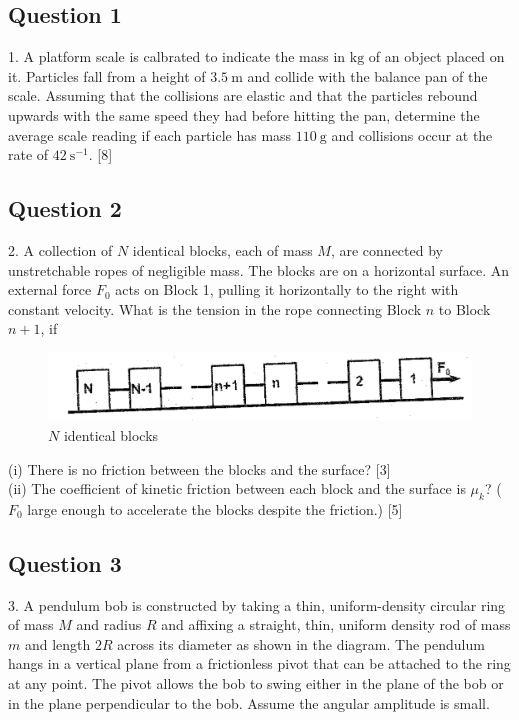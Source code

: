 \documentclass{article}
\begin{document}
\subsection{Question 1}
1. A platform scale is calbrated to indicate the mass in $\mathrm{kg}$ of an object placed on it. Particles fall from a height of $3.5 \mathrm{~m}$ and collide with the balance pan of the scale. Assuming that the collisions are elastic and that the particles rebound upwards with the same speed they had before hitting the pan, determine the average scale reading if each particle has mass $110 \mathrm{~g}$ and collisions occur at the rate of $42 \mathrm{~s}^{-1}$. [8] \\

\subsection{Question 2}
2. A collection of $N$ identical blocks, each of mass $M$, are connected by unstretchable ropes of negligible mass. The blocks are on a horizontal surface. An external force $F_{0}$ acts on Block 1, pulling it horizontally to the right with constant velocity. What is the tension in the rope connecting Block $n$ to Block $n+1$, if
\begin{figure}
	\centering
	\includegraphics[width=0.7\linewidth]{spho_book_TYS_images/2012q1.png}
	\caption{$N$ identical blocks}
\end{figure}
(i) There is no friction between the blocks and the surface? [3] \\
(ii) The coefficient of kinetic friction between each block and the surface is $\mu_{k}$? ( $F_{0}$ large enough to accelerate the blocks despite the friction.) [5] \\

\subsection{Question 3}
3. A pendulum bob is constructed by taking a thin, uniform-density circular ring of mass $M$ and radius $R$ and affixing a straight, thin, uniform density rod of mass ${m}$ and length $2 R$ across its diameter as shown in the diagram. The pendulum hangs in a vertical plane from a frictionless pivot that can be attached to the ring at any point. The pivot allows the bob to swing either in the plane of the bob or in the plane perpendicular to the bob. Assume the angular amplitude is small.
\end{document}
